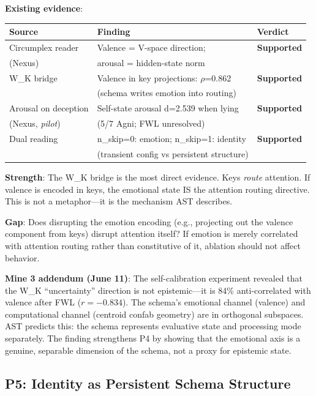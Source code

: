 \documentclass[11pt,letterpaper]{article}
\begin{document}
\textbf{Existing evidence}:

\begin{table}[H]
\centering
\begin{tabular}{lll}
\toprule
Source & Finding & Verdict \\
\midrule
Circumplex reader & Valence = V-space direction; &
  \textbf{Supported} \\
(Nexus) & arousal = hidden-state norm & \\
W\_K bridge & Valence in key projections: $\rho$=0.862 &
  \textbf{Supported} \\
 & (schema writes emotion into routing) & \\
Arousal on deception & Self-state arousal d=2.539 when lying &
  \textbf{Supported} \\
(Nexus, \emph{pilot}) & (5/7 Agni; FWL unresolved) & \\
Dual reading & n\_skip=0: emotion; n\_skip=1: identity &
  \textbf{Supported} \\
 & (transient config vs persistent structure) & \\
\bottomrule
\end{tabular}
\end{table}

\textbf{Strength}: The W\_K bridge is the most direct evidence. Keys
\emph{route} attention. If valence is encoded in keys, the emotional
state IS the attention routing directive. This is not a metaphor---it
is the mechanism AST describes.

\textbf{Gap}: Does disrupting the emotion encoding (e.g., projecting
out the valence component from keys) disrupt attention itself?
If emotion is merely correlated with attention routing rather than
constitutive of it, ablation should not affect behavior.

\textbf{Mine 3 addendum (June 11)}: The self-calibration experiment
revealed that the W\_K ``uncertainty'' direction is not epistemic---it
is 84\% anti-correlated with valence after FWL ($r=-0.834$). The
schema's emotional channel (valence) and computational channel
(centroid confab geometry) are in orthogonal subspaces. AST predicts
this: the schema represents evaluative state and processing mode
separately. The finding strengthens P4 by showing that the emotional
axis is a genuine, separable dimension of the schema, not a proxy
for epistemic state.

\subsection{P5: Identity as Persistent Schema Structure}
\end{document}
